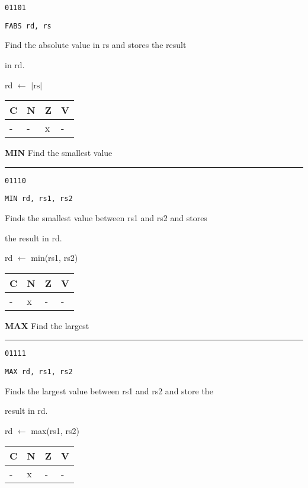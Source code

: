 \documentclass{article}
\begin{document}
{\large
	 \texttt{01101} \par
	\smallbreak
	 \texttt{FABS rd, rs} \par
	\smallbreak
	 Find the absolute value in rs and stores the result \par
	\makebox[3.5cm][l]{  } in rd. \par
	\smallbreak
	 rd $\leftarrow$ $|\textrm{rs}|$ \par
	\smallbreak
	 \begin{tabular}{llll} C \quad & N \quad & Z \quad & V \\ \hline - & - & x & - \\ \end{tabular}
}

\bigskip\bigskip

\flushleft
\LARGE\textbf{MIN} \large \hfill Find the smallest value

\kern-3pt
\noindent\rule{16.5cm}{0.4pt}
\normalsize

{\large
	 \texttt{01110} \par
	\smallbreak
	 \texttt{MIN rd, rs1, rs2} \par
	\smallbreak
	 Finds the smallest value between rs1 and rs2 and stores \par
	\makebox[3.5cm][l]{  } the result in rd. \par
	\smallbreak
	 rd $\leftarrow$ min(rs1, rs2) \par
	\smallbreak
	 \begin{tabular}{llll} C \quad & N \quad & Z \quad & V \\ \hline - & x & - & - \\ \end{tabular}
}

\pagebreak

\flushleft
\LARGE\textbf{MAX} \large \hfill Find the largest

\kern-3pt
\noindent\rule{16.5cm}{0.4pt}
\normalsize

{\large
	 \texttt{01111} \par
	\smallbreak
	 \texttt{MAX rd, rs1, rs2} \par
	\smallbreak
	 Finds the largest value between rs1 and rs2 and store the \par
	\makebox[3.5cm][l]{  } result in rd. \par
	\smallbreak
	 rd $\leftarrow$ max(rs1, rs2) \par
	\smallbreak
	 \begin{tabular}{llll} C \quad & N \quad & Z \quad & V \\ \hline - & x & - & - \\ \end{tabular}
}
\end{document}
